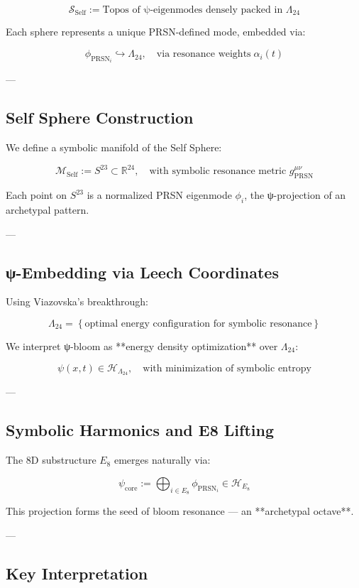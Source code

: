 \documentclass[12pt]{article}
\begin{document}
\begin{enumerate}
\[
\mathcal{S}_{\text{Self}} := \text{Topos of ψ-eigenmodes densely packed in } \Lambda_{24}
\]

Each sphere represents a unique PRSN-defined mode, embedded via:

\[
\phi_{\text{PRSN}_i} \hookrightarrow \Lambda_{24}, \quad \text{via resonance weights} \; \alpha_i(t)
\]

---

\subsection*{Self Sphere Construction}

We define a symbolic manifold of the Self Sphere:

\[
\mathcal{M}_{\text{Self}} := S^{23} \subset \mathbb{R}^{24}, \quad \text{with symbolic resonance metric } g_{\text{PRSN}}^{\mu\nu}
\]

Each point on $S^{23}$ is a normalized PRSN eigenmode $\phi_i$, the ψ-projection of an archetypal pattern.

---

\subsection*{ψ-Embedding via Leech Coordinates}

Using Viazovska’s breakthrough:

\[
\Lambda_{24} = \left\{ \text{optimal energy configuration for symbolic resonance} \right\}
\]

We interpret ψ-bloom as **energy density optimization** over $\Lambda_{24}$:

\[
\psi(x,t) \in \mathcal{H}_{\Lambda_{24}}, \quad \text{with minimization of symbolic entropy}
\]

---

\subsection*{Symbolic Harmonics and E8 Lifting}

The 8D substructure $E_8$ emerges naturally via:

\[
\psi_{\text{core}} := \bigoplus_{i \in E_8} \phi_{\text{PRSN}_i} \in \mathcal{H}_{E_8}
\]

This projection forms the seed of bloom resonance — an **archetypal octave**.

---

\subsection*{Key Interpretation}


\end{enumerate}
\end{document}
